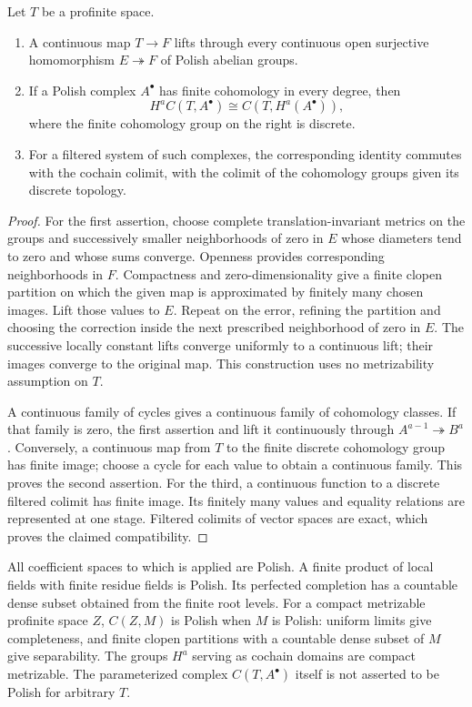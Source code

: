 \begin{lemma}\label{h3:co:parameters}
Let $T$ be a profinite space.
\begin{enumerate}
\item A continuous map $T\to F$ lifts through every continuous open
surjective homomorphism $E\twoheadrightarrow F$ of Polish abelian groups.
\item If a Polish complex $A^\bullet$ has finite cohomology in every
degree, then
\[
 H^a C(T,A^\bullet)\cong C(T,H^a(A^\bullet)),
\]
where the finite cohomology group on the right is discrete.
\item For a filtered system of such complexes, the corresponding
identity commutes with the cochain colimit, with the colimit of the
cohomology groups given its discrete topology.
\end{enumerate}
\end{lemma}

\begin{proof}
For the first assertion, choose complete translation-invariant metrics
on the groups and successively smaller neighborhoods of zero in $E$
whose diameters tend to zero and whose sums converge.  Openness provides
corresponding neighborhoods in $F$.  Compactness and zero-dimensionality
give a finite clopen partition on which the given map is approximated
by finitely many chosen images.  Lift those values to $E$.
Repeat on the error, refining the partition and choosing the correction
inside the next prescribed neighborhood of zero in $E$.  The successive
locally constant lifts converge uniformly to a continuous lift; their
images converge to the original map.  This construction uses no
metrizability assumption on $T$.

A continuous family of cycles gives a continuous family of cohomology
classes.  If that family is zero, the first assertion and
 lift it continuously through
$A^{a-1}\twoheadrightarrow B^a$.  Conversely, a continuous map from
$T$ to the finite discrete cohomology group has finite image; choose a
cycle for each value to obtain a continuous family.  This proves the
second assertion.  For the third, a continuous function to a discrete
filtered colimit has finite image.  Its finitely many values and equality
relations are represented at one stage.  Filtered colimits of vector
spaces are exact, which proves the claimed compatibility.
\end{proof}

All coefficient spaces to which  is applied are
Polish.  A finite product of local fields with finite residue fields is
Polish.  Its perfected completion has a countable dense subset obtained
from the finite root levels.  For a compact metrizable profinite space
$Z$, $C(Z,M)$ is Polish when $M$ is Polish: uniform limits give
completeness, and finite clopen partitions with a countable dense subset
of $M$ give separability.  The groups $H^a$ serving as cochain domains
are compact metrizable.  The parameterized complex $C(T,A^\bullet)$
itself is not asserted to be Polish for arbitrary $T$.

